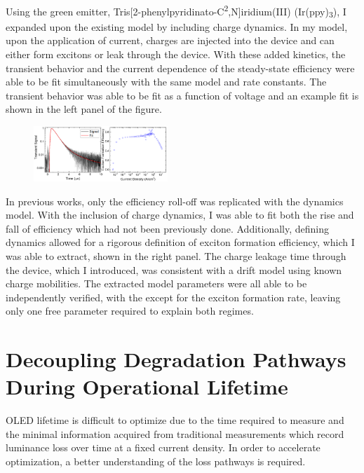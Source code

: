 \documentclass[a4paper,titlepage]{article}
\begin{document}
Using the green emitter, Tris[2-phenylpyridinato-C\textsuperscript{2},N]iridium(III) (Ir(ppy)\textsubscript{3}), I expanded upon the existing model by including charge dynamics.  In my model, upon the application of current, charges are injected into the device and can either form excitons or leak through the device.  With these added kinetics, the transient behavior and the current dependence of the steady-state efficiency were able to be fit simultaneously with the same model and rate constants.  The transient behavior was able to be fit as a function of voltage and an example fit is shown in the left panel of the figure.  

\begin{figure}
\vspace{-15pt}
\includegraphics[width=0.45\textwidth]{unified}
\vspace{-20pt}
\end{figure}

In previous works, only the efficiency roll-off was replicated with the dynamics model.  With the inclusion of charge dynamics, I was able to fit both the rise and fall of efficiency which had not been previously done.  Additionally, defining dynamics allowed for a rigorous definition of exciton formation efficiency, which I was able to extract, shown in the right panel.  The charge leakage time through the device, which I introduced, was consistent with a drift model using known charge mobilities.  The extracted model parameters were all able to be independently verified, with the except for the exciton formation rate, leaving only one free parameter required to explain both regimes.

\section*{Decoupling Degradation Pathways During Operational Lifetime}

OLED lifetime is difficult to optimize due to the time required to measure and the minimal information acquired from traditional measurements which record luminance loss over time at a fixed current density.  In order to accelerate optimization, a better understanding of the loss pathways is required.  
\end{document}
